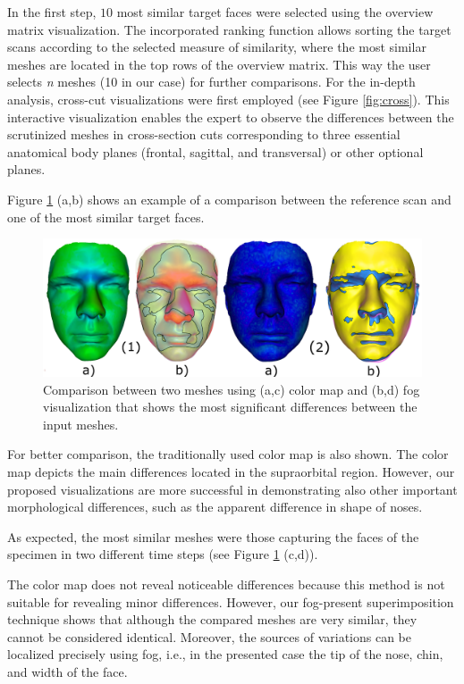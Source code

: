 \documentclass[final,5p,times]{elsarticle}
\begin{document}
In the first step, $10$ most similar target faces were selected using the overview matrix visualization.
The incorporated ranking function allows sorting the target scans according to the selected measure of similarity, where the most similar meshes are located in the top rows of the overview matrix. 
This way the user selects \textit{n} meshes (10 in our case) for further comparisons. 
For the in-depth analysis, cross-cut visualizations were first employed (see Figure \ref{fig:cross}).
This interactive visualization enables the expert to observe the differences between the scrutinized meshes in cross-section cuts corresponding to three essential anatomical body planes (frontal, sagittal, and transversal) or other optional planes. 

Figure \ref{fig:case1} (a,b) shows an example of a comparison between the reference scan and one of the most similar target faces. 

\begin{figure}[htb]
	\centering
  \includegraphics[width=1.0\linewidth]{pictures/case1.png}
  \caption{\label{fig:case1}Comparison between two meshes using (a,c) color map and (b,d) fog visualization  that shows the most significant differences between the input meshes.}
\end{figure}

For better comparison, the traditionally used color map is also shown.
The color map depicts the main differences located in the supraorbital region. 
However, our proposed visualizations are more successful in demonstrating also other important morphological differences, such as the apparent difference in shape of noses.
 
As expected, the most similar meshes were those capturing the faces of the specimen in two different time steps (see Figure \ref{fig:case1} (c,d)).  

The color map does not reveal noticeable differences because this method is not suitable for revealing minor differences.
However, our fog-present superimposition technique shows that although the compared meshes are very similar, they cannot be considered identical. Moreover, the sources of variations can be localized precisely using fog, i.e., in the presented case the tip of the nose, chin, and width of the face.
\end{document}
